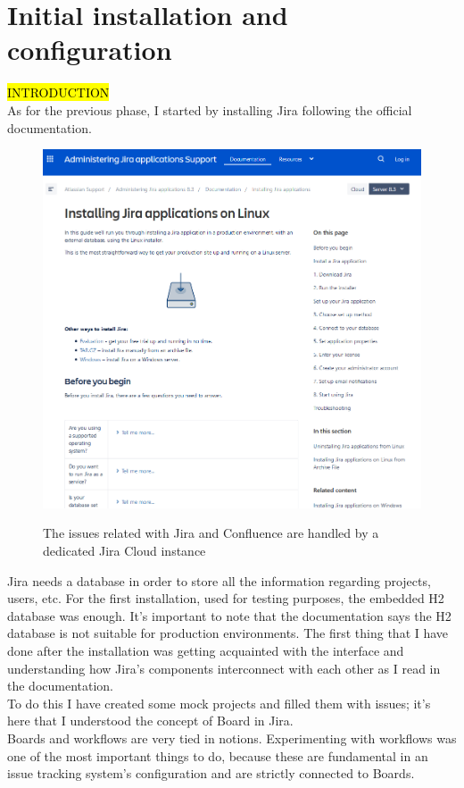 \section{Initial installation and configuration}	
	\hl{INTRODUCTION}\\
	As for the previous phase, I started by installing Jira following the official documentation.
	\begin{figure}[H]
		\centering
		\includegraphics[width=1\textwidth]{resources/jira_installation}\\
		\caption{The issues related with Jira and Confluence are handled by a dedicated Jira Cloud instance}
	\end{figure}
	Jira needs a database in order to store all the information regarding projects, users, etc.
	For the first installation, used for testing purposes, the embedded H2 database was enough.
	It's important to note that the documentation says the H2 database is not suitable for production environments.
	The first thing that I have done after the installation was getting acquainted with the interface and understanding how Jira's components interconnect with each other as I read in the documentation.\\
	To do this I have created some mock projects and filled them with issues; it's here that I understood the concept of Board in Jira.\\
	Boards and workflows are very tied in notions.
	Experimenting with workflows was one of the most important things to do, because these are fundamental in an issue tracking system's configuration and are strictly connected to Boards.
	

